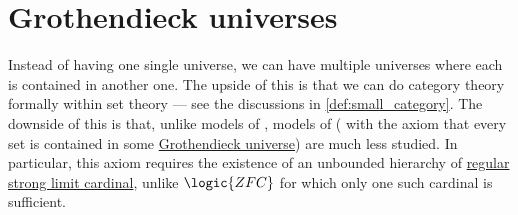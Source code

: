 \section{Grothendieck universes}\label{sec:grothendieck_universes}

Instead of having one single universe, we can have multiple universes where each is contained in another one. The upside of this is that we can do category theory formally within set theory --- see the discussions in \cref{def:small_category}. The downside of this is that, unlike models of \hyperref[def:zfc]{}, models of \hyperref[def:axiom_of_universes]{} ( with the axiom that every set is contained in some \hyperref[def:grothendieck_universe]{Grothendieck universe}) are much less studied. In particular, this axiom requires the existence of an unbounded hierarchy of \hyperref[rem:strongly_inaccessible_cardinal]{regular strong limit cardinal}, unlike \( \logic{ZFC} \) for which only one such cardinal is sufficient.

